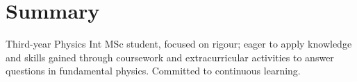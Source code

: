
\section{Summary}
Third-year Physics Int MSc student, focused on rigour; eager to apply knowledge and skills gained through coursework and extracurricular activities to answer questions in fundamental physics. Committed to continuous learning.
